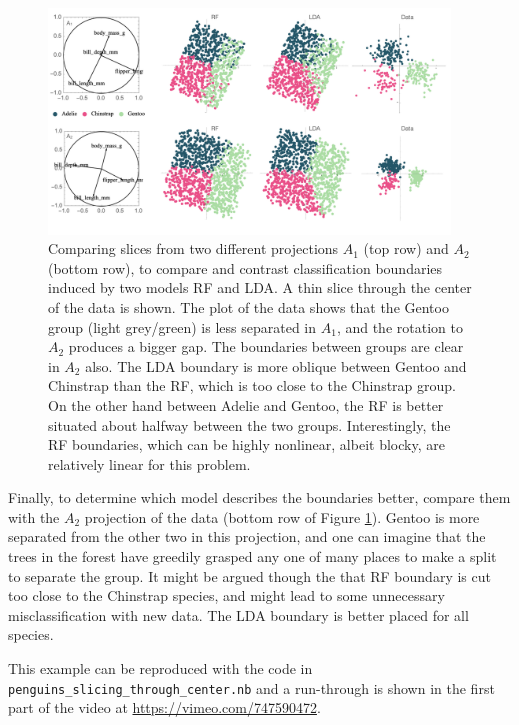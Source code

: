 \documentclass[]{interact}
\theoremstyle{plain}%
\theoremstyle{definition}
\theoremstyle{remark}
\begin{document}
\begin{figure}[ht]
\centerline{\includegraphics[width=0.95\textwidth]{figures/proj2.pdf}}
\caption{Comparing slices from two different projections $A_1$ (top row) and $A_2$ (bottom row), to compare and contrast classification boundaries induced by two models RF and LDA. A thin slice through the center of the data is shown. The plot of the data shows that the Gentoo group (light grey/green) is less separated in $A_1$, and the rotation to $A_2$ produces a bigger gap. The boundaries between groups are clear in $A_2$ also. The LDA boundary is more oblique between Gentoo and Chinstrap than the RF, which is too close to the Chinstrap group. On the other hand between Adelie and Gentoo, the RF is better situated about halfway between the two groups. Interestingly, the RF boundaries, which can be highly nonlinear, albeit blocky, are relatively linear for this problem. }
\label{slice1}
\end{figure}

Finally, to determine which model describes the boundaries better,
compare them with the \(A_2\) projection of the data (bottom row of
Figure \ref{slice1}). Gentoo is more separated from the other two in
this projection, and one can imagine that the trees in the forest have
greedily grasped any one of many places to make a split to separate the
group. It might be argued though the that RF boundary is cut too close
to the Chinstrap species, and might lead to some unnecessary
misclassification with new data. The LDA boundary is better placed for
all species.

This example can be reproduced with the code in
\texttt{penguins\_slicing\_through\_center.nb} and a run-through is
shown in the first part of the video at
\url{https://vimeo.com/747590472}.
\end{document}
